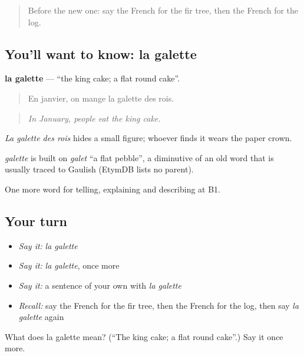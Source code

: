 \label{lesson:FR-C319-galette}



\begin{quote}
Before the new one: say the French for the fir tree, then the French for the log.
\end{quote}

\subsection*{You'll want to know: la galette}
\textbf{la galette} — \textquotedblleft{}the king cake; a flat round cake\textquotedblright{}.

\begin{quote}
En janvier, on mange la galette des rois.
\end{quote}

\begin{quote}
\emph{In January, people eat the king cake.}
\end{quote}

\emph{La galette des rois} hides a small figure; whoever finds it wears the paper crown.

\begin{cousinweb}
\emph{galette} is built on \emph{galet} \textquotedblleft{}a flat pebble\textquotedblright{}, a diminutive of an old word that is usually traced to Gaulish (EtymDB lists no parent).
\end{cousinweb}

\begin{grammarlens}[title={What you've built}]
One more word for telling, explaining and describing at B1.
\end{grammarlens}

\subsection*{Your turn}
\begin{itemize}
\raggedright
  \item \emph{Say it:} \emph{la galette}
  \item \emph{Say it:} \emph{la galette}, once more
  \item \emph{Say it:} a sentence of your own with \emph{la galette}
  \item \emph{Recall:} say the French for the fir tree, then the French for the log, then say \emph{la galette} again
\end{itemize}

\begin{tcolorbox}[breakable,colback=teal!4,colframe=teal!35!black,title={Before you move on}]
What does la galette mean? (\textquotedblleft{}The king cake; a flat round cake\textquotedblright{}.) Say it once more.
\end{tcolorbox}
